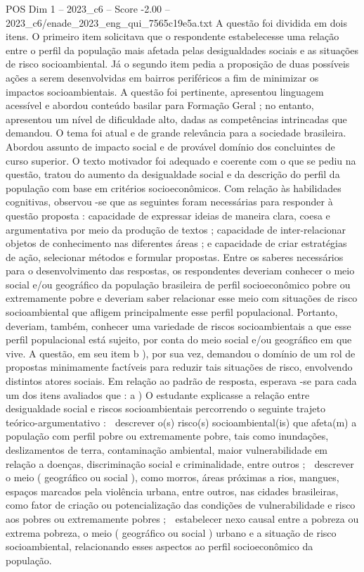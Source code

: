 \begin{textsample}{POS Dim 1 – 2023\_c6 – Score -2.00 – 2023\_c6/enade\_2023\_eng\_qui\_7565c19e5a.txt}
A questão foi dividida em dois itens.
O primeiro item solicitava que o respondente estabelecesse uma relação entre o perfil da população mais afetada pelas desigualdades sociais e as situações de risco socioambiental.
Já o segundo item pedia a proposição de duas possíveis ações a serem desenvolvidas em bairros periféricos a fim de minimizar os impactos socioambientais.
A questão foi pertinente, apresentou linguagem acessível e abordou conteúdo basilar para Formação Geral ; no entanto, apresentou um nível de dificuldade alto, dadas as competências intrincadas que demandou.
O tema foi atual e de grande relevância para a sociedade brasileira.
Abordou assunto de impacto social e de provável domínio dos concluintes de curso superior.
O texto motivador foi adequado e coerente com o que se pediu na questão, tratou do aumento da desigualdade social e da descrição do perfil da população com base em critérios socioeconômicos.
Com relação às habilidades cognitivas, observou -se que as seguintes foram necessárias para responder à questão proposta : capacidade de expressar ideias de maneira clara, coesa e argumentativa por meio da produção de textos ; capacidade de inter-relacionar objetos de conhecimento nas diferentes áreas ; e capacidade de criar estratégias de ação, selecionar métodos e formular propostas.
Entre os saberes necessários para o desenvolvimento das respostas, os respondentes deveriam conhecer o meio social e/ou geográfico da população brasileira de perfil socioeconômico pobre ou extremamente pobre e deveriam saber relacionar esse meio com situações de risco socioambiental que afligem principalmente esse perfil populacional.
Portanto, deveriam, também, conhecer uma variedade de riscos socioambientais a que esse perfil populacional está sujeito, por conta do meio social e/ou geográfico em que vive.
A questão, em seu item b ), por sua vez, demandou o domínio de um rol de propostas minimamente factíveis para reduzir tais situações de risco, envolvendo distintos atores sociais.
Em relação ao padrão de resposta, esperava -se para cada um dos itens avaliados que : a ) O estudante explicasse a relação entre desigualdade social e riscos socioambientais percorrendo o seguinte trajeto teórico-argumentativo :  descrever o(s) risco(s) socioambiental(is) que afeta(m) a população com perfil pobre ou extremamente pobre, tais como inundações, deslizamentos de terra, contaminação ambiental, maior vulnerabilidade em relação a doenças, discriminação social e criminalidade, entre outros ;  descrever o meio ( geográfico ou social ), como morros, áreas próximas a rios, mangues, espaços marcados pela violência urbana, entre outros, nas cidades brasileiras, como fator de criação ou potencialização das condições de vulnerabilidade e risco aos pobres ou extremamente pobres ;  estabelecer nexo causal entre a pobreza ou extrema pobreza, o meio ( geográfico ou social ) urbano e a situação de risco socioambiental, relacionando esses aspectos ao perfil socioeconômico da população.

\end{textsample}
